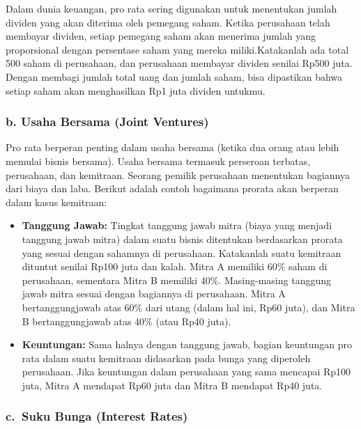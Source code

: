 \documentclass[
]{book}
\providecommand{\tightlist}{%
  \setlength{\itemsep}{0pt}\setlength{\parskip}{0pt}}
\begin{document}
Dalam dunia keuangan, pro rata sering digunakan untuk menentukan jumlah dividen yang akan diterima oleh pemegang saham. Ketika perusahaan telah membayar dividen, setiap pemegang saham akan menerima jumlah yang proporsional dengan persentase saham yang mereka miliki.Katakanlah ada total 500 saham di perusahaan, dan perusahaan membayar dividen senilai Rp500 juta. Dengan membagi jumlah total uang dan jumlah saham, bisa dipastikan bahwa setiap saham akan menghasilkan Rp1 juta dividen untukmu.

\hypertarget{b.-usaha-bersama-joint-ventures}{%
\subsubsection*{b. Usaha Bersama (Joint Ventures)}\label{b.-usaha-bersama-joint-ventures}}

Pro rata berperan penting dalam usaha bersama (ketika dua orang atau lebih memulai bisnis bersama). Usaha bersama termasuk perseroan terbatas, perusahaan, dan kemitraan. Seorang pemilik perusahaan menentukan bagiannya dari biaya dan laba. Berikut adalah contoh bagaimana prorata akan berperan dalam kasus kemitraan:

\begin{itemize}
\tightlist
\item
  \textbf{Tanggung Jawab:} Tingkat tanggung jawab mitra (biaya yang menjadi tanggung jawab mitra) dalam suatu bisnis ditentukan berdasarkan prorata yang sesuai dengan sahamnya di perusahaan. Katakanlah suatu kemitraan dituntut senilai Rp100 juta dan kalah. Mitra A memiliki 60\% saham di perusahaan, sementara Mitra B memiliki 40\%. Masing-masing tanggung jawab mitra sesuai dengan bagiannya di perusahaan. Mitra A bertanggungjawab atas 60\% dari utang (dalam hal ini, Rp60 juta), dan Mitra B bertanggungjawab atas 40\% (atau Rp40 juta).
\item
  \textbf{Keuntungan:} Sama halnya dengan tanggung jawab, bagian keuntungan pro rata dalam suatu kemitraan didasarkan pada bunga yang diperoleh perusahaan. Jika keuntungan dalam perusahaan yang sama mencapai Rp100 juta, Mitra A mendapat Rp60 juta dan Mitra B mendapat Rp40 juta.
\end{itemize}

\hypertarget{c.-suku-bunga-interest-rates}{%
\subsubsection*{c.~Suku Bunga (Interest Rates)}\label{c.-suku-bunga-interest-rates}}
\end{document}
